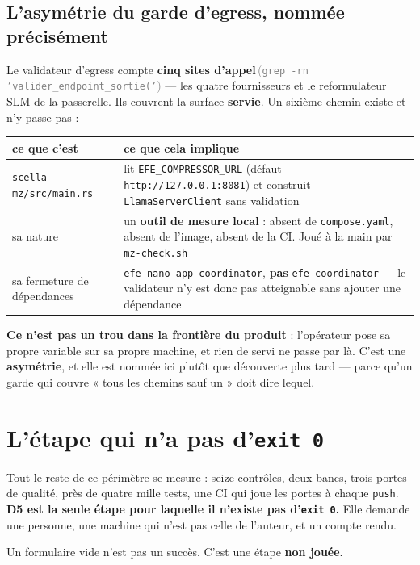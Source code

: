 \documentclass[10pt]{report}
\newcommand{\code}[1]{\texttt{\small #1}}
\newcommand{\att}[1]{\textcolor{amber}{\textbf{#1}}}
\newcommand{\mesure}[2]{\textbf{#1}\,\footnotesize\textcolor{grey}{(#2)}\normalsize}
\begin{document}
\subsection*{L'asymétrie du garde d'egress, nommée précisément}

Le validateur d'egress compte \mesure{cinq sites d'appel}{\code{grep -rn 'valider\_endpoint\_sortie('}}
--- les quatre fournisseurs et le reformulateur SLM de la passerelle. Ils couvrent la surface
\textbf{servie}. Un sixième chemin existe et n'y passe pas :

\begin{longtable}{@{}p{4.9cm}p{10.1cm}@{}}
\toprule \textbf{ce que c'est} & \textbf{ce que cela implique} \\ \midrule \endhead
\code{scella-mz/src/main.rs} & lit \code{EFE\_COMPRESSOR\_URL} (défaut \code{http://127.0.0.1:8081}) et construit \code{LlamaServerClient} sans validation \\
sa nature & un \textbf{outil de mesure local} : absent de \code{compose.yaml}, absent de l'image, absent de la CI. Joué à la main par \code{mz-check.sh} \\
sa fermeture de dépendances & \code{efe-nano-app-coordinator}, \textbf{pas} \code{efe-coordinator} --- le validateur n'y est donc pas atteignable sans ajouter une dépendance \\
\bottomrule
\end{longtable}

\att{Ce n'est pas un trou dans la frontière du produit} : l'opérateur pose sa propre variable sur sa
propre machine, et rien de servi ne passe par là. C'est une \textbf{asymétrie}, et elle est nommée
ici plutôt que découverte plus tard --- parce qu'un garde qui couvre « tous les chemins sauf un »
doit dire lequel.

\section{L'étape qui n'a pas d'\texttt{exit 0}}

\begin{these}
Tout le reste de ce périmètre se mesure : seize contrôles, deux bancs, trois portes de qualité,
près de quatre mille tests, une CI qui joue les portes à chaque \code{push}. \textbf{D5 est la seule
étape pour laquelle il n'existe pas d'\code{exit 0}.} Elle demande une personne, une machine qui
n'est pas celle de l'auteur, et un compte rendu.

Un formulaire vide n'est pas un succès. C'est une étape \textbf{non jouée}.
\end{these}
\end{document}
